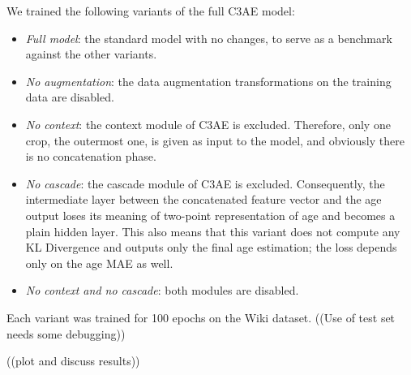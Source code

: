 We trained the following variants of the full C3AE model:

\begin{itemize}
  \item \textit{Full model}: the standard model with no changes,
    to serve as a benchmark against the other variants.
  \item \textit{No augmentation}: the data augmentation transformations
    on the training data are disabled.
  \item \textit{No context}: the context module of C3AE is excluded.
    Therefore, only one crop, the outermost one, is given as input to
    the model, and obviously there is no concatenation phase.
  \item \textit{No cascade}: the cascade module of C3AE is excluded.
    Consequently, the intermediate layer between the concatenated feature vector
    and the age output loses its meaning of two-point representation of age
    and becomes a plain hidden layer. This also means that this variant
    does not compute any KL Divergence and outputs only the final age estimation;
    the loss depends only on the age MAE as well.
  \item \textit{No context and no cascade}: both modules are disabled.
\end{itemize}

Each variant was trained for 100 epochs on the Wiki dataset.
((Use of test set needs some debugging))

((plot and discuss results))
